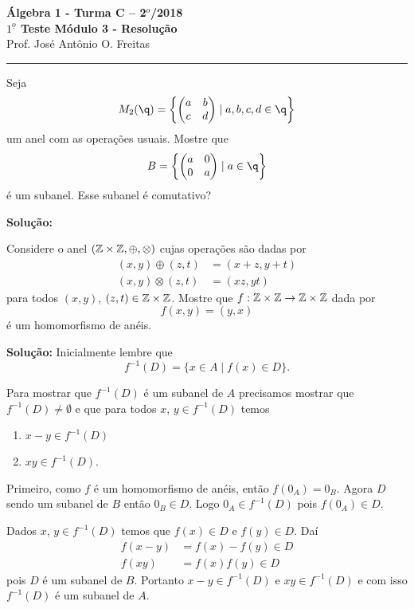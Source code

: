 \documentclass[12pt]{article}
\begin{document}


\begin{center}
{\Large\bf {\'A}lgebra 1 - Turma C -- 2$^{o}$/2018} \\ \vspace{9pt} {\large\bf
  $1^{\underline{o}}$ Teste Módulo 3 - Resolu\c{c}\~ao}\\
\vspace{9pt} Prof. Jos{\'e} Ant{\^o}nio O. Freitas
\end{center}
\hrule

\vspace{.6cm}

\questao Seja
\[
	M_2(\q) = \left\{ \begin{pmatrix}
		a & b\\c & d
	\end{pmatrix} \mid a,b,c,d \in \q\right\}
\]
um anel com as operações usuais. Mostre que
\[
	B = \left\{ \begin{pmatrix}
		a & 0\\0 & a
	\end{pmatrix} \mid a \in \q\right\}	
\]
é um subanel. Esse subanel é comutativo?

\noindent\textbf{Solu\c{c}\~ao:}


\vspace{.5cm}

\questao Considere o anel $(\mathbb{Z} \times \mathbb{Z}, \oplus, \otimes)$ cujas operações são dadas por
\begin{align*}
	(x, y) \oplus (z, t) &= (x + z, y + t)\\
	(x, y) \otimes (z, t) &= (xz, yt)
\end{align*}
para todos $(x, y)$, $(z, t) \in \mathbb{Z} \times \mathbb{Z}$. Mostre que $f : \mathbb{Z} \times \mathbb{Z} \to \mathbb{Z} \times \mathbb{Z}$ dada por
\[
	f(x, y) = (y, x)
\]
é um homomorfismo de anéis.

\noindent\textbf{Solu\c{c}\~ao:} Inicialmente lembre que
\[
	f^{-1}(D) = \{x \in A \mid f(x) \in D\}.
\]

Para mostrar que $f^{-1}(D)$ é um subanel de $A$ precisamos mostrar que $f^{-1}(D) \ne \emptyset$ e que para todos $x$, $y \in f^{-1}(D)$ temos
\begin{enumerate}[label=({\alph*})]
	\item $x - y \in f^{-1}(D)$
	\item $xy \in f^{-1}(D)$.
\end{enumerate}

Primeiro, como $f$ é um homomorfismo de anéis, então $f(0_A) = 0_B$. Agora $D$ sendo um subanel de $B$ então $0_B \in D$. Logo $0_A \in f^{-1}(D)$ pois $f(0_A) \in D$.

Dados $x$, $y \in f^{-1}(D)$ temos que $f(x) \in D$ e $f(y) \in D$. Daí
\begin{align*}
	f(x - y) &= f(x) - f(y) \in D\\
	f(xy) &= f(x)f(y) \in D
\end{align*}
pois $D$ é um subanel de $B$. Portanto $x - y \in f^{-1}(D)$ e $xy \in f^{-1}(D)$ e com isso $f^{-1}(D)$ é um subanel de $A$.
\end{document}
